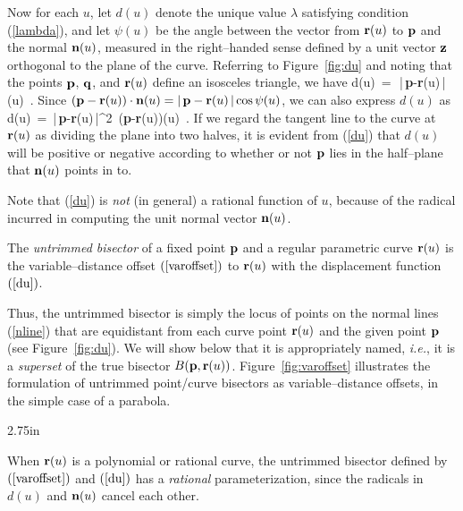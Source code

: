 
Now for each $u$, let $d(u)$ denote the unique value $\lambda$
satisfying condition (\ref{lambda}), and let $\psi(u)$ be the angle
between the vector from ${\bf r}(u)$ to ${\bf p}$ and the normal
${\bf n}(u)$, measured in the right--handed sense defined by a unit
vector ${\bf z}$ orthogonal to the plane of the curve. Referring to
Figure~\ref{fig:du} and noting that the points ${\bf p}$, ${\bf q}$,
and ${\bf r}(u)$ define an isosceles triangle, we have
\be \label{du0}
d(u) \,=\, \half\,|\,{\bf p}-{\bf r}(u)\,|\sec\psi(u) \,.
\ee
Since $({\bf p}-{\bf r}(u))\cdot{\bf n}(u)=|\,{\bf p}-{\bf r}(u)\,|
\cos\psi(u)$, we can also express $d(u)$ as
\be \label{du}
d(u) \,=\, {|\,{\bf p}-{\bf r}(u)\,|^2 \,({\bf p}-{\bf r}(u))(u)} \,.
\ee
If we regard the tangent line to the curve at ${\bf r}(u)$ as dividing
the plane into two halves, it is evident from (\ref{du}) that $d(u)$
will be positive or negative according to whether or not ${\bf p}$
lies in the half--plane that ${\bf n}(u)$ points in to.

Note that (\ref{du}) is {\it not\/} (in general) a rational function
of $u$, because of the radical incurred in computing the unit normal
vector ${\bf n}(u)$.

\begin{dfn}
The {\it untrimmed bisector\/} of a fixed point ${\bf p}$ and a
regular parametric curve ${\bf r}(u)$ is the variable--distance offset
$(\ref{varoffset})$ to ${\bf r}(u)$ with the displacement function
$(\ref{du})$.
\end{dfn}

Thus, the untrimmed bisector is simply the locus of points on the
normal lines (\ref{nline}) that are equidistant from each curve point
${\bf r}(u)$ and the given point ${\bf p}$ (see Figure~\ref{fig:du}).
We will show below that it is appropriately named, {\it i.e.}, it
is a {\it superset\/} of the true bisector $B({\bf p},{\bf r}(u))$.
Figure~\ref{fig:varoffset} illustrates the formulation of untrimmed
point/curve bisectors as variable--distance offsets, in the simple
case of a parabola.

{2.75in}

\begin{rmk}
{\rm
When ${\bf r}(u)$ is a polynomial or rational curve, the untrimmed
bisector defined by $(\ref{varoffset})$ and $(\ref{du})$ has a {\it
rational\/} parameterization, since the radicals in $d(u)$ and
${\bf n}(u)$ cancel each other.
}
\end{rmk}

